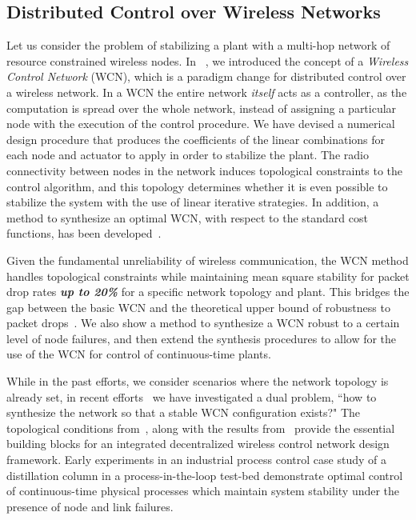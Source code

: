 \subsection{\textbf{Distributed Control over Wireless Networks}}
Let us consider the problem of stabilizing a plant with a multi-hop network of resource constrained wireless nodes. 
In ~\cite{wcn_tac11}, we introduced the concept of a {\it Wireless Control Network} (WCN), which is a paradigm change for distributed control over a wireless network. In a WCN the entire network {\it itself} acts as a controller, as the computation is spread over the whole network, instead of assigning a particular node with the execution of the control procedure.  We have devised a numerical design procedure that produces the coefficients of the linear combinations for each node and actuator to apply in order to stabilize the plant.  The radio connectivity between nodes in the network induces topological constraints to the control algorithm, and this topology determines whether it is even possible to stabilize the system with the use of linear iterative strategies.  In addition, a method to synthesize an optimal WCN, with respect to the standard cost functions, has been developed~\cite{JIISc_distrCPS}. 

Given the fundamental unreliability of wireless communication, the WCN method handles topological constraints while maintaining mean square stability for packet drop rates \textbf{\emph{up to 20\%}} for a specific network topology and plant. This bridges the gap between the basic WCN and the theoretical upper bound of robustness to packet drops~\cite{Hadjicostis02}. We also show a method to synthesize a WCN robust to a certain level of node failures, and then extend the synthesis procedures to allow for the use of the WCN for control of continuous-time plants. 

While in the past efforts, we consider scenarios where the network topology is already set, in recent efforts~\cite{wcn_jsac12, wcn_cdc11} we have investigated a dual problem, ``how to synthesize the network so that a stable WCN configuration exists?" The topological conditions from~\cite{wcn_jsac12}, along with the results from~\cite{wcn_tac11} provide the essential building blocks for an integrated decentralized wireless control network design framework. Early experiments in an industrial process control case study of a distillation column in a process-in-the-loop test-bed demonstrate optimal control of continuous-time physical processes which maintain system stability under the presence of node and link failures. 


